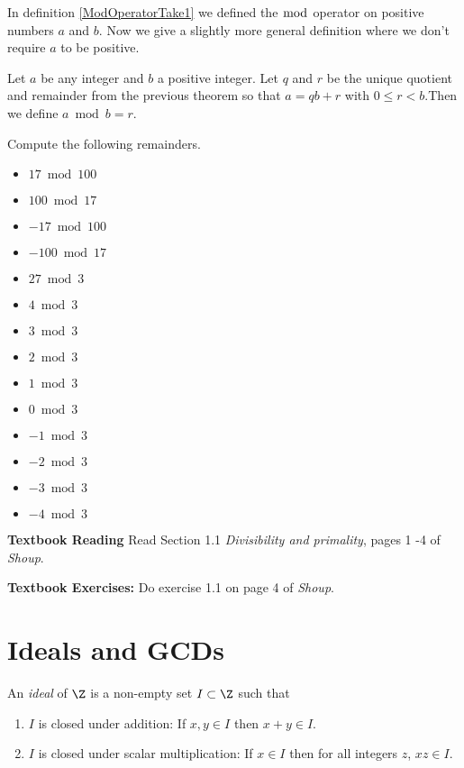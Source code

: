 \documentclass[oneside,12pt]{amsart}
\begin{document}
In definition \ref{ModOperatorTake1} we defined the $\bmod$ operator on positive
numbers $a$ and $b$. Now we give a slightly more general definition where we
don't require $a$ to be positive.

\begin{definition}
\label{ModOperator}
Let $a$ be any integer and $b$ a positive integer. Let $q$ and $r$
be the unique quotient and remainder from the previous theorem so that
$a=qb+r$ with $0\leq r < b$.Then we define
$a \bmod b=r$.
\end{definition}

\begin{homework} Compute the following remainders.
\begin{itemize}
\item $17 \bmod 100$
\item $100 \bmod 17$
\item $-17 \bmod 100$
\item $-100 \bmod 17$
\item $27 \bmod 3$
\item $4 \bmod 3$
\item $3 \bmod 3$
\item $2 \bmod 3$
\item $1 \bmod 3$
\item $0 \bmod 3$
\item $-1 \bmod 3$
\item $-2 \bmod 3$
\item $-3 \bmod 3$
\item $-4 \bmod 3$
\end{itemize}
\end{homework}

\textbf{Textbook Reading} Read Section 1.1
\emph{Divisibility and primality}, pages 1 -4 of \emph{Shoup}.

\textbf{Textbook Exercises:} Do exercise 1.1 on page 4 of \emph{Shoup}.

\section{Ideals and GCDs}

\begin{definition}
An \emph{ideal} of $\Z$ is a non-empty set $I\subset\Z$ such that
\begin{enumerate}
\item $I$ is closed under addition: If $x,y\in I$ then $x+y\in I$.
\item $I$ is closed under scalar multiplication:
If $x\in I$ then for all integers $z$, $xz\in I$.
\end{enumerate}
\end{definition}
\end{document}
